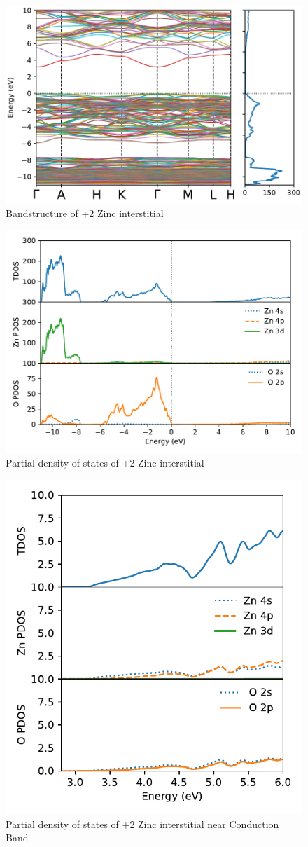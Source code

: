 
\begin{figure}[tbh!]
	\centering
	\includegraphics[width=0.7\linewidth]{"images/rnd/band-dos_Zn_i-p2"}
	\caption[Bandstructure of +2 Zinc interstitial]{Bandstructure of +2 Zinc interstitial}
\end{figure}

\begin{figure}[tbh!]
	\centering
	\includegraphics[width=0.7\linewidth]{"images/rnd/dos-pdos_Zn_i-p2"}
	\caption[Partial density of states of +2 Zinc interstitial]{Partial density of states of +2 Zinc interstitial }
\end{figure}

\begin{figure}[tbh!]
	\centering
	\includegraphics[width=0.5\linewidth]{"images/rnd/dos-pdos-zoom_Zn_i-p2"}
	\caption[Partial density of states of +2 Zinc interstitial near Conduction Band]{Partial density of states of +2 Zinc interstitial near Conduction Band}
\end{figure}



